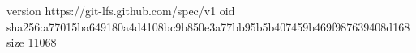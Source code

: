 version https://git-lfs.github.com/spec/v1
oid sha256:a77015ba649180a4d4108bc9b850e3a77bb95b5b407459b469f987639408d168
size 11068
